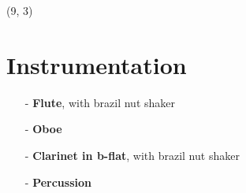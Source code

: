 \documentclass[10pt]{article}
\begin{document}
\begin{textblock}{14} (9, 3)

\section{Instrumentation}

\begin{itemize}

    \item[-] \textbf{Flute}, with brazil nut shaker \\

    \item[-] \textbf{Oboe} \\

    \item[-] \textbf{Clarinet in b-flat}, with brazil nut shaker \\

    \item[-] \textbf{Percussion} \\


\end{itemize}
\end{textblock}
\end{document}
